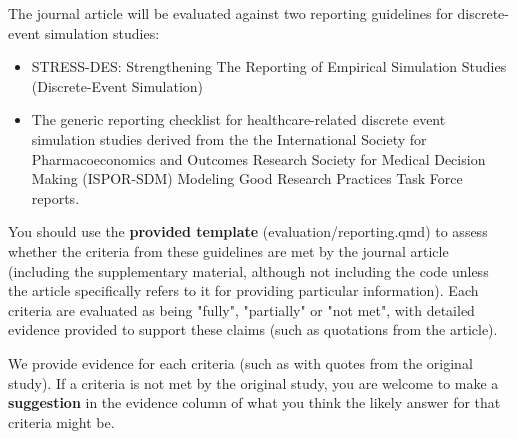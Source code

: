The journal article will be evaluated against two reporting guidelines for discrete-event simulation studies:
\begin{itemize}
    \item STRESS-DES: Strengthening The Reporting of Empirical Simulation Studies (Discrete-Event Simulation)\autocite{monks_strengthening_2019}
    \item The generic reporting checklist for healthcare-related discrete event simulation studies derived from the the International Society for Pharmacoeconomics and Outcomes Research Society for Medical Decision Making (ISPOR-SDM) Modeling Good Research Practices Task Force reports.\autocite{zhang_reporting_2020}
\end{itemize}

You should use the \textbf{provided template} (evaluation/reporting.qmd) to assess whether the criteria from these guidelines are met by the journal article (including the supplementary material, although not including the code unless the article specifically refers to it for providing particular information). Each criteria are evaluated as being "fully", "partially" or "not met", with detailed evidence provided to support these claims (such as quotations from the article).

We provide evidence for each criteria (such as with quotes from the original study). If a criteria is not met by the original study, you are welcome to make a \textbf{suggestion} in the evidence column of what you think the likely answer for that criteria might be.